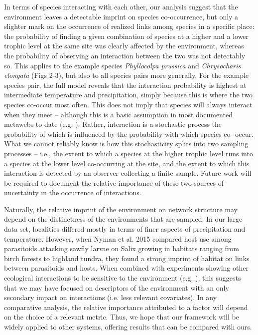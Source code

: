 \documentclass[12pt]{article}
\begin{document}
In terms of species interacting with each other, our analysis suggest that the
environment leaves a detectable imprint on species co-occurrence, but only a
slighter mark on the occurrence of realized links among species in a specific
place: the probability of finding a given combination of species at a higher
and a lower trophic level at the same site was clearly affected by the
environment, whereas the probability of observing an interaction between the
two was not detectably so. This applies to the example species \textit{Phyllocolpa
prussica} and \textit{Chrysocharis elongata} (Figs 2-3), but also to all species pairs
more generally. For the example species pair, the full model reveals that the
interaction probability is highest at intermediate temperature and
precipitation, simply because this is where the two species co-occur most
often. This does not imply that species will always interact when they meet –
although this is a basic assumption in most documented metawebs to date (e.g.
\citealt{Havens1992, Woods2015}). Rather, interaction is a stochastic process the
probability of which is influenced by the probability with which species co-
occur. What we cannot reliably know is how this stochasticity splits into two
sampling processes – i.e., the extent to which a species at the higher trophic
level runs into a species at the lower level co-occurring at the site, and the
extent to which this interaction is detected by an observer collecting a
finite sample. Future work will be required to document the relative
importance of these two sources of uncertainty in the occurrence of
interactions.

Naturally, the relative imprint of the environment on network structure may
depend on the distinctness of the environments that are sampled. In our large
data set, localities differed mostly in terms of finer aspects of
precipitation and temperature. However, when Nyman et al. 2015 compared host
use among parasitoids attacking sawfly larvae on Salix growing in habitats
ranging from birch forests to highland tundra, they found a strong imprint of
habitat on links between parasitoids and hosts. When combined with experiments
showing other ecological interactions to be sensitive to the environment (e.g.
\citep{Mckinnon2010; Maunsell2015}), this suggests that we may have focused on
descriptors of the environment with an only secondary impact on interactions
(i.e. less relevant covariates). In any comparative analysis, the relative
importance attributed to a factor will depend on the choice of a relevant
metric. Thus, we hope that our framework will be widely applied to other
systems, offering results that can be compared with ours.
\end{document}
